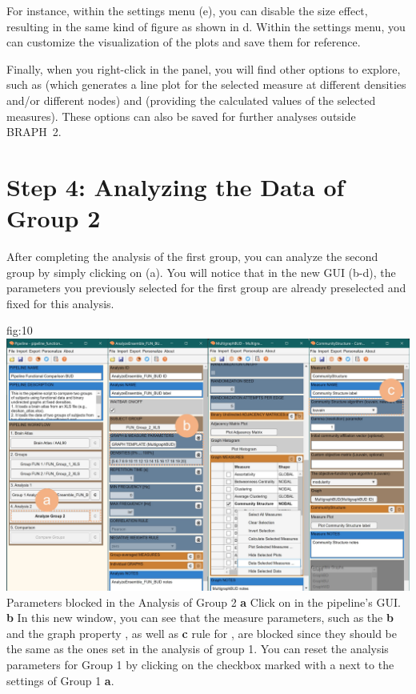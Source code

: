 \documentclass[justified]{tufte-handout}
\begin{document}
For instance, within the settings menu (e), you can disable the size effect, resulting in the same kind of figure as shown in d. Within the settings menu, you can customize the visualization of the plots and save them for reference.

Finally, when you right-click in the  panel, you will find other options to explore, such as  (which generates a line plot for the selected measure at different densities and/or different nodes) and  (providing the calculated values of the selected measures). These options can also be saved for further analyses outside BRAPH~2.

\section{Step 4: Analyzing the Data of Group 2}

After completing the analysis of the first group, you can analyze the second group by simply clicking on  (a). You will notice that in the new GUI (b-d), the parameters you previously selected for the first group are already preselected and fixed for this analysis. 

	{fig:10}
	{
	\includegraphics{fig10.jpg}
	}
	{Parameters blocked in the Analysis of Group 2}
	{
	{\bf a} Click on  in the pipeline's GUI.
	{\bf b} In this new window, you can see that the measure parameters, such as the {\bf b}  and the graph property , as well as {\bf c} rule for , are blocked since they should be the same as the ones set in the analysis of group 1. You can reset the analysis parameters for Group 1 by clicking on the checkbox marked with a  next to the settings of Group 1 {\bf a}.
	}
\end{document}
